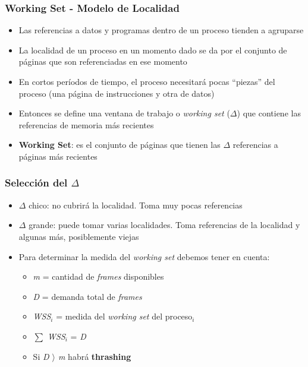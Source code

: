 \begin{frame}
  \frametitle{Working Set - \textbf{Modelo de Localidad}}
  \begin{itemize}
  	\item Las referencias a datos y programas dentro de un proceso tienden a agruparse
  	\item La localidad de un proceso en un momento dado se da por el conjunto de páginas que son referenciadas en ese momento
  	\item En cortos períodos de tiempo, el proceso necesitará pocas ``piezas'' del proceso (una página de instrucciones y otra de datos)
  	\item Entonces se define una ventana de trabajo o \emph{working set} ($\Delta$) que contiene las referencias de memoria más recientes
  	\item \textbf{Working Set}: es el conjunto de páginas que tienen las $\Delta$ referencias a páginas más recientes
  \end{itemize}
\end{frame}

\begin{frame}
  \frametitle{Selección del $\Delta$}
  \begin{itemize}
    \item $\Delta$ chico: no cubrirá la localidad. Toma muy pocas referencias
    \item $\Delta$ grande: puede tomar varias localidades. Toma referencias de la localidad y algunas más, posiblemente viejas
    \item Para determinar la medida del \emph{working set} debemos tener en cuenta:
    \begin{itemize}
      \item \emph{m} = cantidad de \emph{frames} disponibles
      \item \emph{D} = demanda total de \emph{frames}
      \item \emph{WSS$_i$} = medida del \emph{working set} del proceso$_i$
      \item \emph{$\sum$ WSS$_i$} = \emph{D}
      \item Si \emph{D $\rangle$ m} habrá \textbf{thrashing}
    \end{itemize}    
  \end{itemize}
\end{frame}